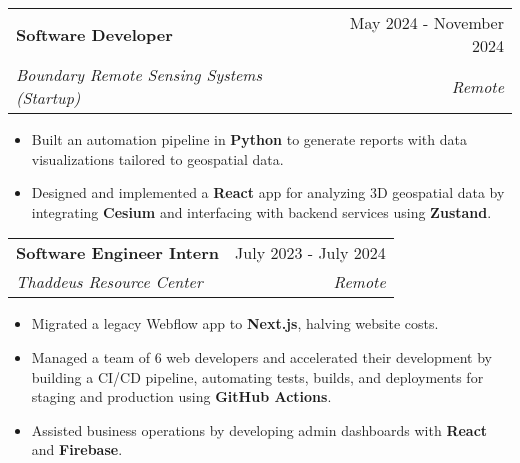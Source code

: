 \documentclass[letterpaper,11pt]{article}
\makeatletter
\newcommand{\resumeItem}[1]{
  \item\setstretch{.95}\small{
    {#1 \vspace{-2pt}}
  }
}
\newcommand{\resumeSubheading}[4]{
  \vspace{-2pt}\item
    \begin{tabular*}{0.97\textwidth}[t]{l@{\extracolsep{\fill}}r}
      \textbf{#1} & #2 \\
      \textit{\small#3} & \textit{\small #4} \\
    \end{tabular*}\vspace{-4.8pt}
}
\newcommand{\resumeItemListStart}{\begin{itemize}}
\newcommand{\resumeItemListEnd}{\end{itemize}\vspace{-5pt}}
\makeatother
\begin{document}
\resumeSubheading
{Software Developer}{May 2024 - November 2024}
{Boundary Remote Sensing Systems (Startup)}{Remote}
\resumeItemListStart
\resumeItem{Built an automation pipeline in \textbf{Python} to generate reports with data visualizations tailored to geospatial data.}
\resumeItem{Designed and implemented a \textbf{React} app for analyzing 3D geospatial data by integrating \textbf{Cesium} and interfacing with backend services using \textbf{Zustand}.}
\resumeItemListEnd


\resumeSubheading
{Software Engineer Intern}{July 2023 - July 2024}
{Thaddeus Resource Center}{Remote}
\resumeItemListStart
\resumeItem{Migrated a legacy Webflow app to \textbf{Next.js}, halving website costs.}
\resumeItem{Managed a team of 6 web developers and accelerated their development by building a CI/CD pipeline, automating tests, builds, and deployments for staging and production using \textbf{GitHub Actions}.}
\resumeItem{Assisted business operations by developing admin dashboards with \textbf{React} and \textbf{Firebase}.}
\resumeItemListEnd
\end{document}
